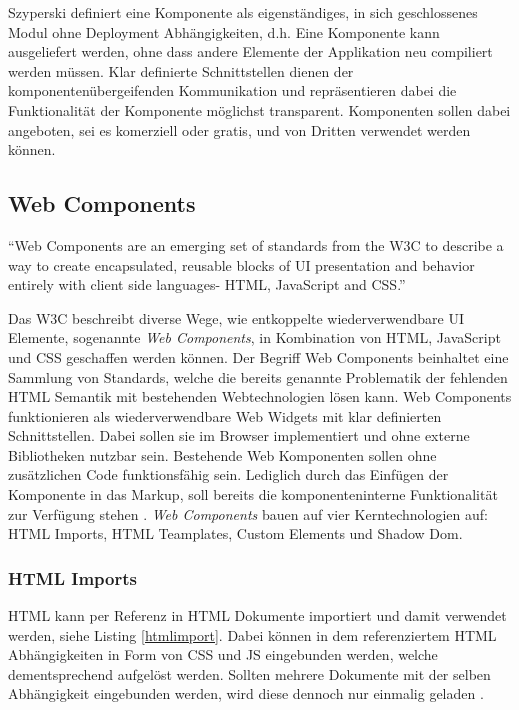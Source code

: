 Szyperski definiert eine Komponente als eigenständiges, in sich geschlossenes Modul ohne Deployment
Abhängigkeiten, d.h. Eine Komponente kann ausgeliefert werden, ohne dass andere Elemente der Applikation neu compiliert werden müssen.
Klar definierte Schnittstellen dienen der komponentenübergeifenden Kommunikation und repräsentieren
dabei die Funktionalität der Komponente möglichst transparent.
Komponenten sollen dabei angeboten, sei es komerziell oder gratis,
und von Dritten verwendet werden können.


\subsection{Web Components}

``Web Components are an emerging set of standards from the W3C to describe a way to create encapsulated,
reusable blocks of UI presentation and behavior entirely with client side languages- HTML, JavaScript and CSS.''
\cite[42]{Web-Component-Architecture}
\vspace{0.3cm}

Das \ac{W3C} beschreibt diverse Wege, wie entkoppelte wiederverwendbare UI Elemente, sogenannte \emph{Web Components},
in Kombination von \ac{HTML}, JavaScript und \ac{CSS} geschaffen werden können.
Der Begriff Web Components beinhaltet eine Sammlung von Standards,
welche die bereits genannte Problematik der fehlenden HTML Semantik mit bestehenden Webtechnologien lösen kann.
Web Components funktionieren als wiederverwendbare Web Widgets mit klar definierten Schnittstellen.
Dabei sollen sie im Browser implementiert und ohne externe Bibliotheken nutzbar sein.
Bestehende Web Komponenten sollen ohne zusätzlichen Code funktionsfähig sein. Lediglich durch das Einfügen der Komponente
in das Markup, soll bereits die komponenteninterne Funktionalität zur Verfügung stehen
\cite[42]{Web-Component-Architecture}.
\emph{Web Components} bauen auf vier Kerntechnologien auf: HTML Imports, HTML Teamplates, Custom Elements und Shadow Dom.

\subsubsection{HTML Imports}
HTML kann per Referenz in HTML Dokumente importiert und damit verwendet werden, siehe Listing \ref{htmlimport}.
Dabei können in dem referenziertem HTML Abhängigkeiten in Form von CSS und JS eingebunden werden,
welche dementsprechend aufgelöst werden.
Sollten mehrere Dokumente mit der selben Abhängigkeit eingebunden werden, wird diese dennoch nur einmalig geladen
\cite{HTMLI44:online}.

